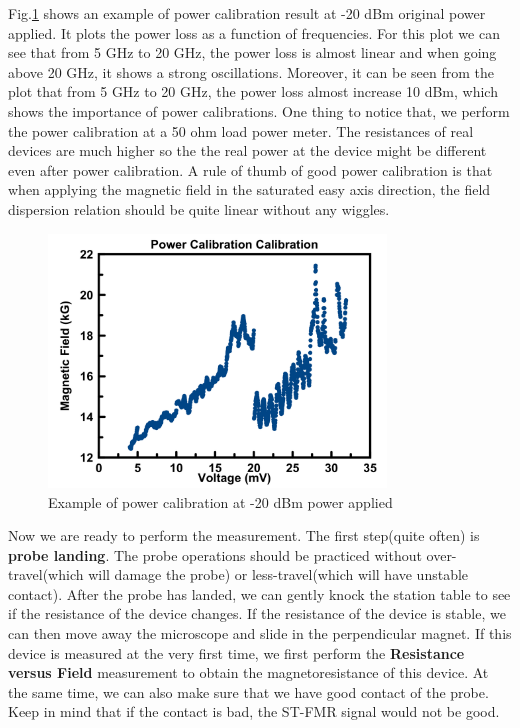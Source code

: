 Fig.\ref{fig:powercal} shows an example of power calibration result at -20 dBm original power applied. It plots the power loss as a function of frequencies. For this plot we can see that from 5 GHz to 20 GHz, the power loss is almost linear and when going above 20 GHz, it shows a strong oscillations. Moreover, it can be seen from the plot that from 5 GHz to 20 GHz, the power loss almost increase 10 dBm, which shows the importance of power calibrations. One thing to notice that, we perform the power calibration at a 50 ohm load power meter. The resistances of real devices are much higher so the the real power at the device might be different even after power calibration. A rule of thumb of good power calibration is that when applying the magnetic field in the saturated easy axis direction, the field dispersion relation should be quite linear without any wiggles.


\begin{figure}[h]
  \centering
  \includegraphics[width=0.8\textwidth]{fig/appendix/powerCal.png}
  \caption{Example of power calibration at -20 dBm power applied}
  \label{fig:powercal}
\end{figure}

Now we are ready to perform the measurement. The first step(quite often) is \textbf{probe landing}. The probe operations should be practiced without over-travel(which will damage the probe) or less-travel(which will have unstable contact). After the probe has landed, we can gently knock the station table to see if the resistance of the device changes. If the resistance of the device is stable, we can then move away the microscope and slide in the perpendicular magnet. If this device is measured at the very first time, we first perform the \textbf{Resistance versus Field} measurement to obtain the magnetoresistance of this device. At the same time, we can also make sure that we have good contact of the probe. Keep in mind that if the contact is bad, the ST-FMR signal would not be good.

